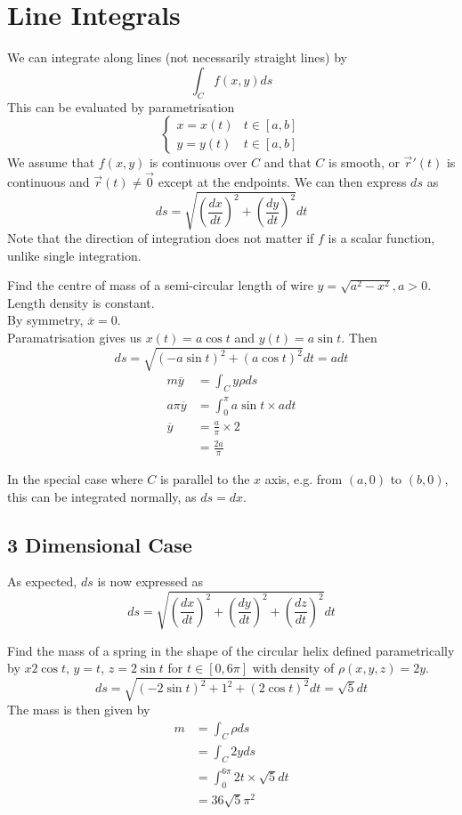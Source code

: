 \documentclass[12pt]{article}
\begin{document}
\section{Line Integrals}

We can integrate along lines (not necessarily straight lines) by
$$\int_C f(x,y)ds$$
This can be evaluated by parametrisation
$$\begin{cases} x = x(t) & t \in [a,b] \\ y = y(t) & t \in [a,b]\end{cases}$$
We assume that $f(x,y)$ is continuous over $C$ and that $C$ is smooth, or $\vec{r}'(t)$ is continuous and $\vec{r}(t)\neq\vec{0}$ except at the endpoints. We can then express $ds$ as
$$ds = \sqrt{\left(\frac{dx}{dt}\right)^2 + \left(\frac{dy}{dt}\right)^2}dt$$
Note that the direction of integration does not matter if $f$ is a scalar function, unlike single integration.
\begin{ex}
	Find the centre of mass of a semi-circular length of wire $y = \sqrt{a^2-x^2}, a > 0$. Length density is constant. \\
	By symmetry, $\overline{x}=0$. \\
	Paramatrisation gives us $x(t) = a\cos t$ and $y(t) = a\sin t$. Then
	$$ds = \sqrt{(-a\sin t)^2 + (a\cos t)^2}dt = adt$$
	\begin{align*}
		m\overline{y} &= \int_C y\rho ds \\
		a\pi\overline{y} &= \int_0^\pi a\sin t \times adt \\
		\overline{y} &= \frac{a}{\pi} \times 2 \\
			     &= \frac{2a}{\pi}
	\end{align*}
\end{ex}

\begin{ex}
	In the special case where $C$ is parallel to the $x$ axis, e.g. from $(a,0)$ to $(b,0)$, this can be integrated normally, as $ds = dx$.
\end{ex}

\subsection{3 Dimensional Case}
As expected, $ds$ is now expressed as
$$ds = \sqrt{\left(\frac{dx}{dt}\right)^2 + \left(\frac{dy}{dt}\right)^2 + \left(\frac{dz}{dt}\right)^2} dt$$

\begin{ex}
	Find the mass of a spring in the shape of the circular helix defined parametrically by $x2\cos t$, $y=t$, $z=2\sin t$ for $t \in [0,6\pi]$ with density of $\rho(x,y,z) = 2y$.
	$$ds = \sqrt{(-2\sin t)^2 + 1^2 + (2\cos t)^2}dt = \sqrt{5}dt$$
	The mass is then given by
	\begin{align*}
		m &= \int_C \rho ds \\
		  &= \int_C 2yds \\
		  &= \int_0^{6\pi} 2t \times \sqrt{5} dt \\
		  &= 36\sqrt{5}\pi^2
	\end{align*}
\end{ex}
\end{document}
